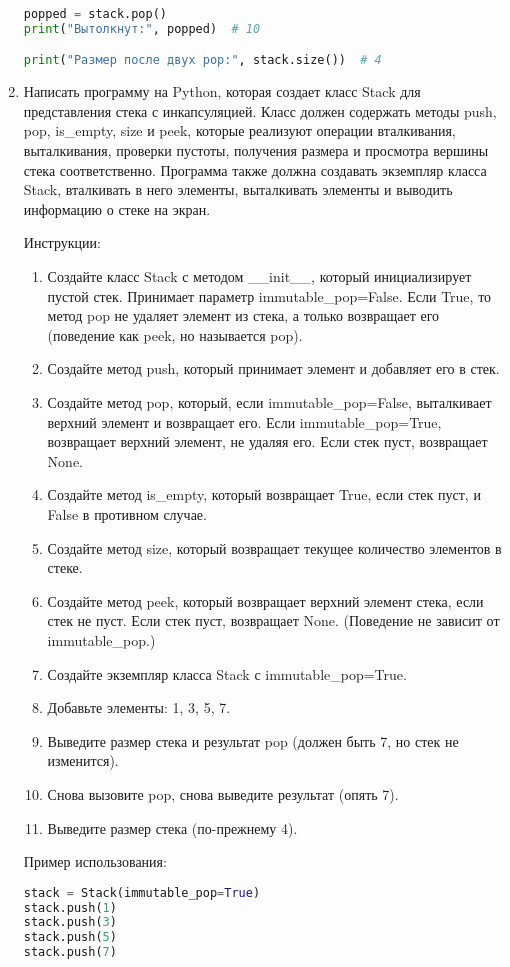 \begin{enumerate}
\begin{lstlisting}[language=Python]
popped = stack.pop()
print("Вытолкнут:", popped)  # 10

print("Размер после двух pop:", stack.size())  # 4
\end{lstlisting}

\item Написать программу на Python, которая создает класс Stack для представления стека с инкапсуляцией. Класс должен содержать методы push, pop, is\_empty, size и peek, которые реализуют операции вталкивания, выталкивания, проверки пустоты, получения размера и просмотра вершины стека соответственно. Программа также должна создавать экземпляр класса Stack, вталкивать в него элементы, выталкивать элементы и выводить информацию о стеке на экран.

Инструкции:
\begin{enumerate}
    \item Создайте класс Stack с методом \_\_init\_\_, который инициализирует пустой стек. Принимает параметр immutable\_pop=False. Если True, то метод pop не удаляет элемент из стека, а только возвращает его (поведение как peek, но называется pop).
    \item Создайте метод push, который принимает элемент и добавляет его в стек.
    \item Создайте метод pop, который, если immutable\_pop=False, выталкивает верхний элемент и возвращает его. Если immutable\_pop=True, возвращает верхний элемент, не удаляя его. Если стек пуст, возвращает None.
    \item Создайте метод is\_empty, который возвращает True, если стек пуст, и False в противном случае.
    \item Создайте метод size, который возвращает текущее количество элементов в стеке.
    \item Создайте метод peek, который возвращает верхний элемент стека, если стек не пуст. Если стек пуст, возвращает None. (Поведение не зависит от immutable\_pop.)
    \item Создайте экземпляр класса Stack с immutable\_pop=True.
    \item Добавьте элементы: 1, 3, 5, 7.
    \item Выведите размер стека и результат pop (должен быть 7, но стек не изменится).
    \item Снова вызовите pop, снова выведите результат (опять 7).
    \item Выведите размер стека (по-прежнему 4).
\end{enumerate}

Пример использования:
\begin{lstlisting}[language=Python]
stack = Stack(immutable_pop=True)
stack.push(1)
stack.push(3)
stack.push(5)
stack.push(7)


\end{lstlisting}
\end{enumerate}
